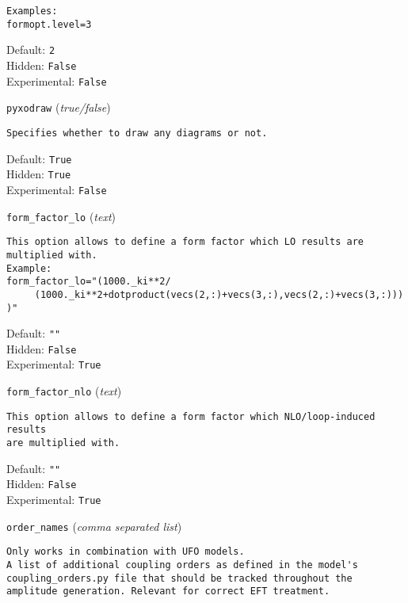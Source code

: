 \begin{basedescript}{\desclabelstyle{\pushlabel}}
\begin{verbatim}
Examples:
formopt.level=3
\end{verbatim}
Default: \verb|2|
\\Hidden: \verb|False|
\\Experimental: \verb|False|
\\\item[\colorbox{gray!30}{\texttt{pyxodraw}}] (\textit{true/false})
\begin{verbatim}
Specifies whether to draw any diagrams or not.
\end{verbatim}
Default: \verb|True|
\\Hidden: \verb|True|
\\Experimental: \verb|False|
\\\item[\colorbox{gray!30}{\texttt{form\_factor\_lo}}] (\textit{text})
\begin{verbatim}
This option allows to define a form factor which LO results are
multiplied with.
Example:
form_factor_lo="(1000._ki**2/
     (1000._ki**2+dotproduct(vecs(2,:)+vecs(3,:),vecs(2,:)+vecs(3,:)))
)"
\end{verbatim}
Default: \verb|""|
\\Hidden: \verb|False|
\\Experimental: \verb|True|
\\\item[\colorbox{gray!30}{\texttt{form\_factor\_nlo}}] (\textit{text})
\begin{verbatim}
This option allows to define a form factor which NLO/loop-induced results
are multiplied with.
\end{verbatim}
Default: \verb|""|
\\Hidden: \verb|False|
\\Experimental: \verb|True|
\\\item[\colorbox{gray!30}{\texttt{order\_names}}] (\textit{comma separated list})
\begin{verbatim}
Only works in combination with UFO models.
A list of additional coupling orders as defined in the model's
coupling_orders.py file that should be tracked throughout the
amplitude generation. Relevant for correct EFT treatment.


\end{verbatim}
\end{basedescript}
